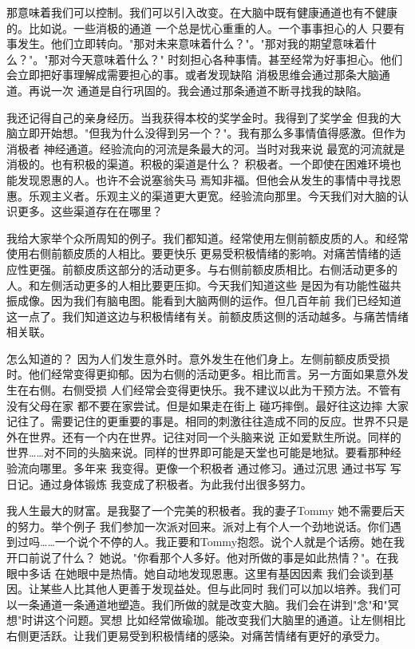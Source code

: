 那意味着我们可以控制。我们可以引入改变。在大脑中既有健康通道也有不健康的。比如说。一些消极的通道 一个总是忧心重重的人。一个事事担心的人 只要有事发生。他们立即转向。"那对未来意味着什么？"。"那对我的期望意味着什么？"。"那对今天意味着什么？" 时刻担心各种事情。甚至经常为好事担心。他们会立即把好事理解成需要担心的事。或者发现缺陷 消极思维会通过那条大脑通道。再说一次 通道是自行巩固的。我会通过那条通道不断寻找我的缺陷。 

我还记得自己的亲身经历。当我获得本校的奖学金时。我得到了奖学金 但我的大脑立即开始想。"但我为什么没得到另一个？"。我有那么多事情值得感激。但作为消极者 神经通道。经验流向的河流是条最大的河。当时对我来说 最宽的河流就是消极的。也有积极的渠道。积极的渠道是什么？ 积极者。一个即使在困难环境也能发现恩惠的人。也许不会说塞翁失马 焉知非福。但他会从发生的事情中寻找恩惠。乐观主义者。乐观主义的渠道更大更宽。经验流向那里。今天我们对大脑的认识更多。这些渠道存在在哪里？ 

我给大家举个众所周知的例子。我们都知道。经常使用左侧前额皮质的人。和经常使用右侧前额皮质的人相比。要更快乐 更易受积极情绪的影响。对痛苦情绪的适应性更强。前额皮质这部分的活动更多。与右侧前额皮质相比。右侧活动更多的人。和左侧活动更多的人相比要更压抑。今天我们知道这些 是因为有功能性磁共振成像。因为我们有脑电图。能看到大脑两侧的运作。但几百年前 我们已经知道这一点了。我们知道这边与积极情绪有关。前额皮质这侧的活动越多。与痛苦情绪相关联。 

怎么知道的？ 因为人们发生意外时。意外发生在他们身上。左侧前额皮质受损时。他们经常变得更抑郁。因为右侧的活动更多。相比而言。另一方面如果意外发生在右侧。右侧受损 人们经常会变得更快乐。我不建议以此为干预方法。不管有没有父母在家 都不要在家尝试。但是如果走在街上 碰巧摔倒。最好往这边摔 大家记往了。需要记住的更重要的事是。相同的刺激往往造成不同的反应。世界不只是外在世界。还有一个内在世界。记往对同一个头脑来说 正如爱默生所说。同样的世界……对不同的头脑来说。同样的世界即可能是天堂也可能是地狱。要看那种经验流向哪里。多年来 我变得。更像一个积极者 通过修习。通过沉思 通过书写 写日记。通过身体锻炼 我变成了积极者。为此我付出很多努力。 

我人生最大的财富。是我娶了一个完美的积极者。我的妻子Tommy 她不需要后天的努力。举个例子 我们参加一次派对回来。派对上有个人一个劲地说话。你们遇到过吗……一个说个不停的人。我正要和Tommy抱怨。说个人就是个话痨。她在我开口前说了什么？ 她说。"你看那个人多好。他对所做的事是如此热情？"。在我眼中多话 在她眼中是热情。她自动地发现恩惠。这里有基因因素 我们会谈到基因。让某些人比其他人更善于发现益处。但与此同时 我们可以加以培养。我们可以一条通道一条通道地塑造。我们所做的就是改变大脑。我们会在讲到"念"和"冥想"时讲这个问题。冥想 比如经常做瑜珈。能改变我们大脑里的通道。让左侧相比右侧更活跃。让我们更易受到积极情绪的感染。对痛苦情绪有更好的承受力。 

